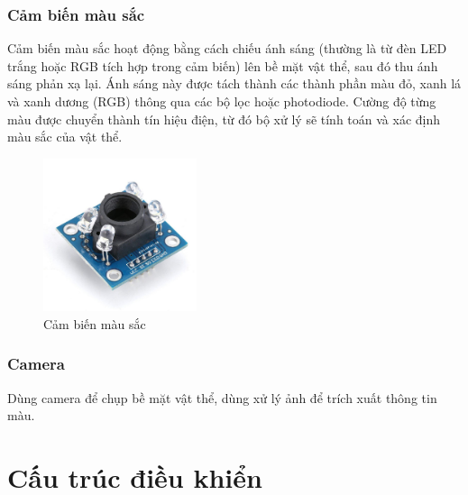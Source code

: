             \subsubsection{Cảm biến màu sắc}
                \hspace*{0.6cm} Cảm biến màu sắc hoạt động bằng cách chiếu ánh sáng (thường là từ đèn LED trắng hoặc RGB tích hợp trong cảm biến) lên bề mặt vật thể, 
                sau đó thu ánh sáng phản xạ lại. Ánh sáng này được tách thành các thành phần màu đỏ, xanh lá và xanh dương (RGB) thông 
                qua các bộ lọc hoặc photodiode. Cường độ từng màu được chuyển thành tín hiệu điện, từ đó bộ xử lý sẽ tính toán và xác định màu sắc của vật thể.
                \begin{figure}[H]
                    \centering
                    \includegraphics[width=0.4\textwidth]{pictures/chapter1/chapter1_pic18_color_sensor.png}
                    \caption{Cảm biến màu sắc}
                    \label{chap1_pic18}
                \end{figure}    
            \subsubsection{Camera}
                \hspace*{0.6cm}Dùng camera để chụp bề mặt vật thể, dùng xử lý ảnh để trích xuất thông tin màu.

    \section{Cấu trúc điều khiển}
